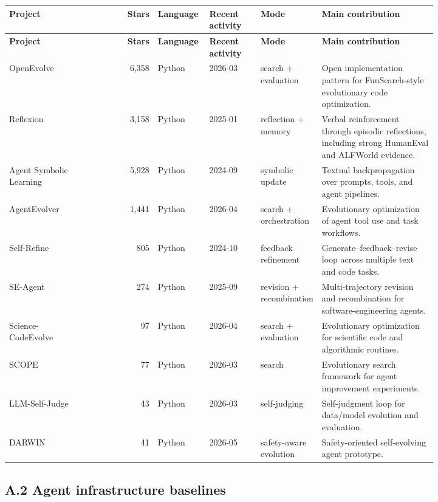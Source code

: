 {\TableTight
\begin{longtable}{@{}L{0.17\linewidth}r L{0.12\linewidth}L{0.12\linewidth}L{0.14\linewidth}L{0.27\linewidth}@{}}
\toprule
\textbf{Project} & \textbf{Stars} & \textbf{Language} & \textbf{Recent activity} & \textbf{Mode} & \textbf{Main contribution} \\
\midrule
\endfirsthead
\toprule
\textbf{Project} & \textbf{Stars} & \textbf{Language} & \textbf{Recent activity} & \textbf{Mode} & \textbf{Main contribution} \\
\midrule
\endhead
\bottomrule
\endlastfoot
OpenEvolve & 6,358 & Python & 2026-03 & search + evaluation & Open implementation pattern for FunSearch-style evolutionary code optimization. \\
Reflexion & 3,158 & Python & 2025-01 & reflection + memory & Verbal reinforcement through episodic reflections, including strong HumanEval and ALFWorld evidence. \\
Agent Symbolic Learning & 5,928 & Python & 2024-09 & symbolic update & Textual backpropagation over prompts, tools, and agent pipelines. \\
AgentEvolver & 1,441 & Python & 2026-04 & search + orchestration & Evolutionary optimization of agent tool use and task workflows. \\
Self-Refine & 805 & Python & 2024-10 & feedback refinement & Generate--feedback--revise loop across multiple text and code tasks. \\
SE-Agent & 274 & Python & 2025-09 & revision + recombination & Multi-trajectory revision and recombination for software-engineering agents. \\
Science-CodeEvolve & 97 & Python & 2026-04 & search + evaluation & Evolutionary optimization for scientific code and algorithmic routines. \\
SCOPE & 77 & Python & 2026-03 & search & Evolutionary search framework for agent improvement experiments. \\
LLM-Self-Judge & 43 & Python & 2026-03 & self-judging & Self-judgment loop for data/model evolution and evaluation. \\
DARWIN & 41 & Python & 2026-05 & safety-aware evolution & Safety-oriented self-evolving agent prototype. \\
\end{longtable}}

\subsection*{A.2 Agent infrastructure baselines}

